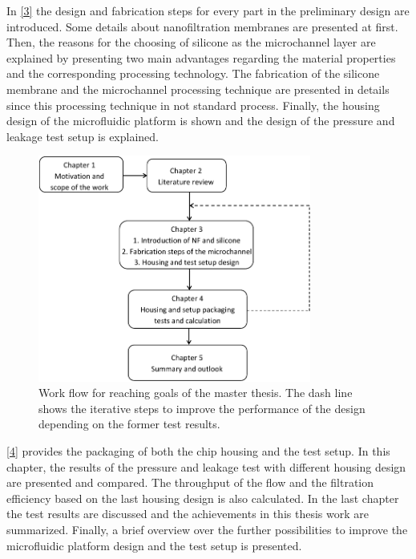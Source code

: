 In \autoref{3} the design and fabrication steps for every part in the preliminary design are introduced. Some details about nanofiltration membranes are presented at first. Then, the reasons for the choosing of silicone as the microchannel layer are explained by presenting two main advantages regarding the material properties and the corresponding processing technology. The fabrication of the silicone membrane and the microchannel processing technique are presented in details since this processing technique in not standard process. Finally, the housing design of the microfluidic platform is shown and the design of the pressure and leakage test setup is explained.

\begin{figure}[h]%
\centering
\includegraphics[width=0.8\textwidth]{figures/introduction/figure1_4}%
\caption{Work flow for reaching goals of the master thesis. The dash line shows the iterative steps to improve the performance of the design depending on the former test results.}%
\label{figure1_4}%
\end{figure}

\autoref{4} provides the packaging of both the chip housing and the test setup. In this chapter, the results of the pressure and leakage test with different housing design are presented and compared. The throughput of the flow and the filtration efficiency based on the last housing design is also calculated. In the last chapter the test results are discussed and the achievements in this thesis work are summarized. Finally, a brief overview over the further possibilities to improve the microfluidic platform design and the test setup is presented.